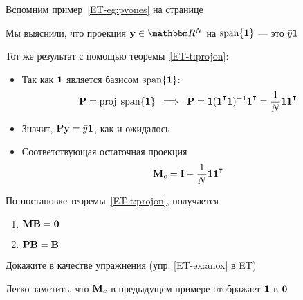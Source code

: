 \begin{frame}
    
    \vspace{2em}
    \Eg
    Вспомним пример~\ref{ET-eg:pvones} на странице~\pageref{ET-eg:pvones}
    
    Мы выяснили, что проекция $\boldy \in \RR^N$ на $\operatorname{span}\{{\mathbf 1}\}$ --- это
    $\bar y {\mathbf 1}$
    
    Тот же результат с помощью теоремы~\eqref{ET-t:projon}:
    \begin{itemize}
        \item Так как ${\mathbf 1}$ является базисом $\operatorname{span}\{{\mathbf 1}\}$:
            \begin{equation*}
                \label{eq:pcz}
                \boldP = \proj \; \Span\{\boldone\} 
                \; \implies \;
                \boldP 
                = \boldone (\boldone^\T\boldone)^{-1} \boldone^\T  
                = \frac{1}{N} \boldone \boldone^\T  
            \end{equation*}
        \item Значит, $\mathbf P {\mathbf y} = \bar y {\mathbf 1}$, как и ожидалось
        \item Соответствующая остаточная проекция
        \begin{equation*}
            \label{eq:pczm}
            \boldM_c
            = \boldI - \frac{1}{N} \boldone \boldone^\T  
        \end{equation*}
    \end{itemize}

\end{frame}

\begin{frame}

     \vspace{2em}
    \Fact{\eqref{ET-fa:anox}} 
    По постановке теоремы~\ref{ET-t:projon}, получается 
    \begin{enumerate}
        \item $\mathbf M \mathbf B = {\mathbf 0}$
        \item $\mathbf P \mathbf B = \mathbf B$
    \end{enumerate}
    
    Докажите в качестве упражнения (упр. \ref{ET-ex:anox} в ET)
    
    \vspace{1em}
    Легко заметить, что $\mathbf M_c$ в предыдущем примере отображает
    ${\mathbf 1}$ в ${\mathbf 0}$
    
\end{frame}

